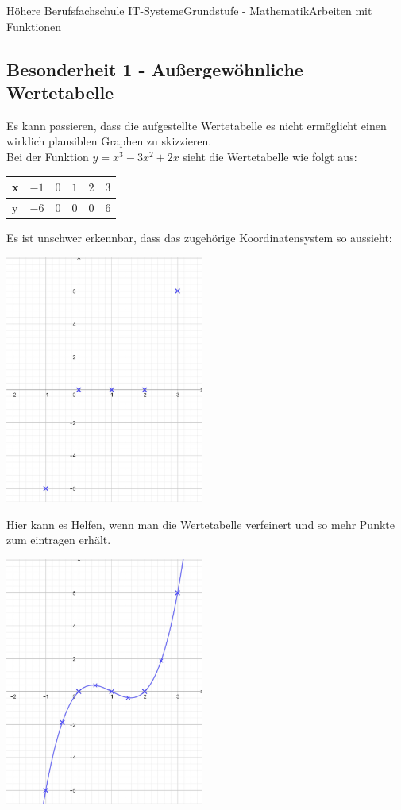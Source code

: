 \documentclass[11pt,twocolumn,oneside,openany,headings=optiontotoc,11pt,numbers=noenddot]{article}
\begin{document}
\begin{worksheet}{Höhere Berufsfachschule IT-Systeme}{Grundstufe - Mathematik}{Arbeiten mit Funktionen}
		\subsection{Besonderheit 1 - Außergewöhnliche Wertetabelle}
		Es kann passieren, dass die aufgestellte Wertetabelle es nicht ermöglicht einen wirklich plausiblen Graphen zu skizzieren.\\
		Bei der Funktion \(y = x^3-3x^2 + 2x\) sieht die Wertetabelle wie folgt aus:
		\begin{tabularx}{0.5\textwidth}{|l|l|l|l|l|l|}
			x & \(-1\) & \(0\) & \(1\) & \(2\) & \(3\)\\
			\hline
			y & \(-6\) & \(0\) & \(0\) & \(0\) & \(6\)
		\end{tabularx}
		Es ist unschwer erkennbar, dass das zugehörige Koordinatensystem so aussieht:\\
		\par\bigskip\noindent
		\includegraphics[width=0.49\textwidth]{../99_Bilder/b1Koord.jpg}\\
		\par\bigskip\noindent
		Hier kann es Helfen, wenn man die Wertetabelle verfeinert und so mehr Punkte zum eintragen erhält.\\
		\par\bigskip\noindent
		\includegraphics[width=0.49\textwidth]{../99_Bilder/b1Koord1.jpg}\\

\end{worksheet}
\end{document}
